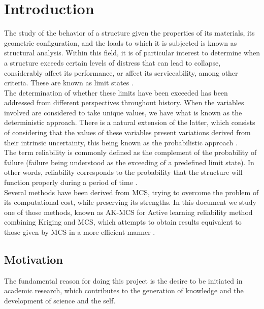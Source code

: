 
\chapter{Introduction}
\label{ch:1}

The study of the behavior of a structure given the properties of its materials, its geometric configuration, and the loads to which it is subjected is known as structural analysis. Within this field, it is of particular interest to determine when a structure exceeds certain levels of distress that can lead to collapse, considerably affect its performance, or affect its serviceability, among other criteria. These are known as limit states \citep{Melchers2018}. \\

The determination of whether these limits have been exceeded has been addressed from different perspectives throughout history. When the variables involved are considered to take unique values, we have what is known as the deterministic approach. There is a natural extension of the latter, which consists of considering that the values of these variables present variations derived from their intrinsic uncertainty, this being known as the probabilistic approach \citep{Ditlevsen1996}. \\

The term reliability is commonly defined as the complement of the probability of failure (failure being understood as the exceeding of a predefined limit state). In other words, reliability corresponds to the probability that the structure will function properly during a period of time \citep{Melchers2018}. \\

Several methods have been derived from MCS, trying to overcome the problem of
its computational cost, while preserving its strengths. In this document we study
one of those methods, known as AK-MCS for Active learning reliability method combining
Kriging and MCS, which attempts to obtain results equivalent to those given by MCS in a 
more efficient manner \citep{Echard2011}.

\section{Motivation}
The fundamental reason for doing this project is the desire to be initiated in academic
research, which contributes to the generation of knowledge and the development of 
science and the self.\\

